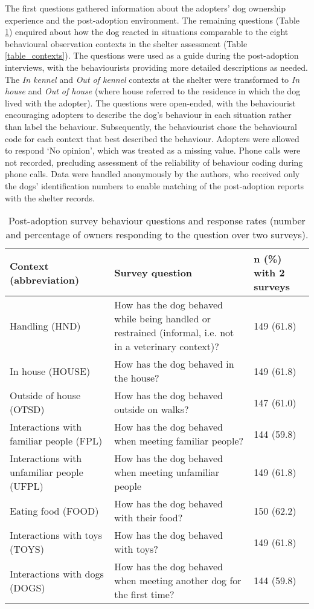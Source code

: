 \documentclass[12pt]{article}
\begin{document}
The first questions gathered information about the adopters' dog ownership experience and the post-adoption environment. The remaining questions (Table \ref{table_postadoptq}) enquired about how the dog reacted in situations comparable to the eight behavioural observation contexts in the shelter assessment (Table \ref{table_contexts}). The questions were used as a guide during the post-adoption interviews, with the behaviourists providing more detailed descriptions as needed. The \textit{In kennel} and \textit{Out of kennel} contexts at the shelter were transformed to \textit{In house} and \textit{Out of house} (where house referred to the residence in which the dog lived with the adopter). The questions were open-ended, with the behaviourist encouraging adopters to describe the dog's behaviour in each situation rather than label the behaviour. Subsequently, the behaviourist chose the behavioural code for each context that best described the behaviour. Adopters were allowed to respond `No opinion', which was treated as a missing value. Phone calls were not recorded, precluding assessment of the reliability of behaviour coding during phone calls. Data were handled anonymously by the authors, who received only the dogs' identification numbers to enable matching of the post-adoption reports with the shelter records.

\begin{table}
  \centering
  \begin{tabular}{p{6cm}p{6cm}p{5cm}}
    \textbf{Context (abbreviation)} & \textbf{Survey question} & \textbf{$\boldsymbol{n}$ (\%) with 2 surveys}\\ \hline
    Handling (HND) & \footnotesize{How has the dog behaved while being handled or restrained (informal, i.e. not in a veterinary context)?} & 149 (61.8)\\
    In house (HOUSE) & \footnotesize{How has the dog behaved in the house?} & 149 (61.8)\\
    Outside of house (OTSD) & \footnotesize{How has the dog behaved outside on walks?} & 147 (61.0)\\
    Interactions with familiar people (FPL) & \footnotesize{How has the dog behaved when meeting familiar people?} & 144 (59.8)\\
    Interactions with unfamiliar people (UFPL) & \footnotesize{How has the dog behaved when meeting unfamiliar people} & 149 (61.8)\\
    Eating food (FOOD) & \footnotesize{How has the dog behaved with their food?} & 150 (62.2)\\
    Interactions with toys (TOYS) & \footnotesize{How has the dog behaved with toys?} & 149 (61.8)\\
    Interactions with dogs (DOGS) & \footnotesize{How has the dog behaved when meeting another dog for the first time?} & 144 (59.8)\\
    \hline
  \end{tabular}
  \caption{Post-adoption survey behaviour questions and response rates (number and percentage of owners responding to the question over two surveys).}
  \label{table_postadoptq}
\end{table}
\end{document}
